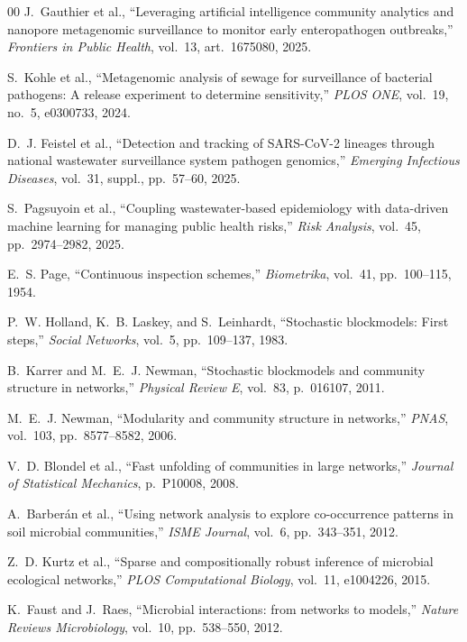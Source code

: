\documentclass[conference]{IEEEtran}
\begin{document}
\begin{thebibliography}{00}
J.~Gauthier et al., ``Leveraging artificial intelligence community analytics
and nanopore metagenomic surveillance to monitor early enteropathogen
outbreaks,'' \textit{Frontiers in Public Health}, vol.~13, art.~1675080, 2025.

S.~Kohle et al., ``Metagenomic analysis of sewage for surveillance of
bacterial pathogens: A release experiment to determine sensitivity,''
\textit{PLOS ONE}, vol.~19, no.~5, e0300733, 2024.

D.~J. Feistel et al., ``Detection and tracking of SARS-CoV-2 lineages through
national wastewater surveillance system pathogen genomics,''
\textit{Emerging Infectious Diseases}, vol.~31, suppl., pp.~57--60, 2025.

S.~Pagsuyoin et al., ``Coupling wastewater-based epidemiology with
data-driven machine learning for managing public health risks,''
\textit{Risk Analysis}, vol.~45, pp.~2974--2982, 2025.

E.~S. Page, ``Continuous inspection schemes,''
\textit{Biometrika}, vol.~41, pp.~100--115, 1954.

P.~W. Holland, K.~B. Laskey, and S.~Leinhardt, ``Stochastic blockmodels:
First steps,'' \textit{Social Networks}, vol.~5, pp.~109--137, 1983.

B.~Karrer and M.~E.~J. Newman, ``Stochastic blockmodels and community
structure in networks,''
\textit{Physical Review E}, vol.~83, p.~016107, 2011.

M.~E.~J. Newman, ``Modularity and community structure in networks,''
\textit{PNAS}, vol.~103, pp.~8577--8582, 2006.

V.~D. Blondel et al., ``Fast unfolding of communities in large networks,''
\textit{Journal of Statistical Mechanics}, p.~P10008, 2008.

A.~Barber\'{a}n et al., ``Using network analysis to explore co-occurrence
patterns in soil microbial communities,''
\textit{ISME Journal}, vol.~6, pp.~343--351, 2012.

Z.~D. Kurtz et al., ``Sparse and compositionally robust inference of
microbial ecological networks,''
\textit{PLOS Computational Biology}, vol.~11, e1004226, 2015.

K.~Faust and J.~Raes, ``Microbial interactions: from networks to models,''
\textit{Nature Reviews Microbiology}, vol.~10, pp.~538--550, 2012.


\end{thebibliography}
\end{document}
